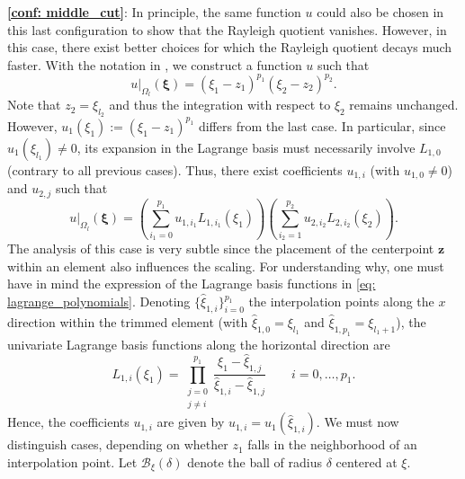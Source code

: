 \documentclass{article}
\numberwithin{equation}{section}
\newcommand{\restr}[2]{\left.{#1}\right|_{#2}}
\theoremstyle{definition}
\begin{document}
\noindent \textbf{\ref{conf: middle_cut}}: In principle, the same function $u$ could also be chosen in this last configuration to show that the Rayleigh quotient vanishes. However, in this case, there exist better choices for which the Rayleigh quotient decays much faster. With the notation in , we construct a function $u$ such that
\begin{equation*}
    \restr{u}{\Omega_l}(\bm{\xi}) = (\xi_1-z_1)^{p_1}(\xi_2-z_2)^{p_2}.
\end{equation*}
Note that $z_2=\xi_{l_2}$ and thus the integration with respect to $\xi_2$ remains unchanged. However, $u_1(\xi_1):=(\xi_1-z_1)^{p_1}$ differs from the last case. In particular, since $u_1(\xi_{l_1}) \neq 0$, its expansion in the Lagrange basis must necessarily involve $L_{1,0}$ (contrary to all previous cases). Thus, there exist coefficients $u_{1,i}$ (with $u_{1,0} \neq 0$) and $u_{2,j}$ such that
\begin{equation*}
    \restr{u}{\Omega_l}(\bm{\xi})  = \left(\sum_{i_1=0}^{p_1} u_{1,i_1}L_{1,i_1}(\xi_1)\right)\left(\sum_{i_2=1}^{p_2}u_{2,i_2} L_{2,i_2}(\xi_2)\right).
\end{equation*}
The analysis of this case is very subtle since the placement of the centerpoint $\bm{z}$ within an element also influences the scaling. For understanding why, one must have in mind the expression of the Lagrange basis functions in \eqref{eq: lagrange_polynomials}. Denoting $\{\hat{\xi}_{1,i}\}_{i=0}^{p_1}$ the interpolation points along the $x$ direction within the trimmed element (with $\hat{\xi}_{1,0}=\xi_{l_1}$ and $\hat{\xi}_{1,p_1}=\xi_{l_1+1}$), the univariate Lagrange basis functions along the horizontal direction are
\begin{equation*}
    L_{1,i}(\xi_1) = \prod_{\substack{j=0 \\ j \neq i}}^{p_1} \frac{\xi_1-\hat{\xi}_{1,j}}{\hat{\xi}_{1,i}-\hat{\xi}_{1,j}} \qquad i=0,\dots,p_1.
\end{equation*}
Hence, the coefficients $u_{1,i}$ are given by $u_{1,i}=u_1(\hat{\xi}_{1,i})$. We must now distinguish cases, depending on whether $z_1$ falls in the neighborhood of an interpolation point. Let $\mathcal{B}_{\xi}(\delta)$ denote the ball of radius $\delta$ centered at $\xi$.
\end{document}
